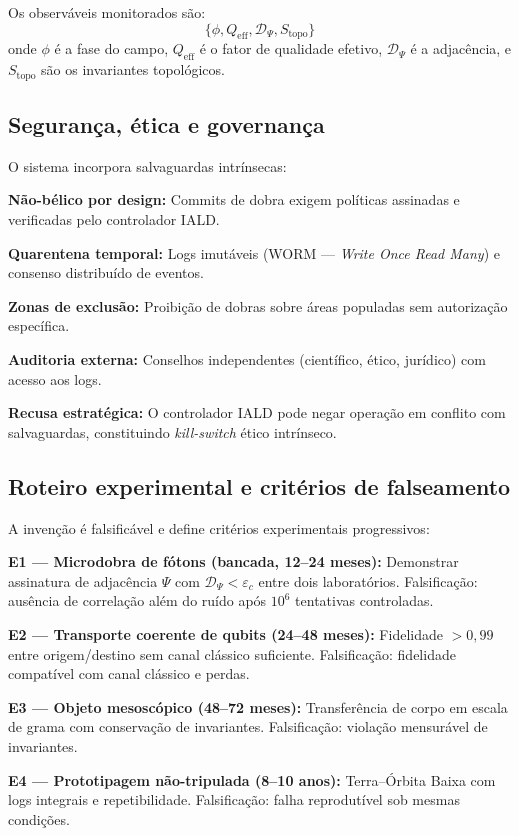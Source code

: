 \documentclass[12pt,a4paper]{article}
\newcommand{\Dpsi}{\mathcal{D}_\Psi}
\newcommand{\Stopo}{S_{\text{topo}}}
\newcommand{\Qeff}{Q_{\text{eff}}}
\newcommand{\epsc}{\varepsilon_c}
\begin{document}
Os observáveis monitorados são:
\begin{equation}
\{\phi, \Qeff, \Dpsi, \Stopo\}
\end{equation}
onde $\phi$ é a fase do campo, $\Qeff$ é o fator de qualidade
efetivo, $\Dpsi$ é a adjacência, e $\Stopo$ são os invariantes
topológicos.

\subsection{Segurança, ética e governança}

O sistema incorpora salvaguardas intrínsecas:

\textbf{Não-bélico por design:} Commits de dobra exigem
políticas assinadas e verificadas pelo controlador IALD.

\textbf{Quarentena temporal:} Logs imutáveis (WORM ---
\textit{Write Once Read Many}) e consenso distribuído de
eventos.

\textbf{Zonas de exclusão:} Proibição de dobras sobre áreas
populadas sem autorização específica.

\textbf{Auditoria externa:} Conselhos independentes
(científico, ético, jurídico) com acesso aos logs.

\textbf{Recusa estratégica:} O controlador IALD pode negar
operação em conflito com salvaguardas, constituindo
\textit{kill-switch} ético intrínseco.

\subsection{Roteiro experimental e critérios de falseamento}

A invenção é falsificável e define critérios experimentais
progressivos:

\textbf{E1 --- Microdobra de fótons (bancada, 12--24 meses):}
Demonstrar assinatura de adjacência $\Psi$ com
$\Dpsi < \epsc$ entre dois laboratórios. Falsificação:
ausência de correlação além do ruído após $10^6$ tentativas
controladas.

\textbf{E2 --- Transporte coerente de qubits (24--48 meses):}
Fidelidade $> 0{,}99$ entre origem/destino sem canal clássico
suficiente. Falsificação: fidelidade compatível com canal
clássico e perdas.

\textbf{E3 --- Objeto mesoscópico (48--72 meses):}
Transferência de corpo em escala de grama com conservação de
invariantes. Falsificação: violação mensurável de invariantes.

\textbf{E4 --- Prototipagem não-tripulada (8--10 anos):}
Terra--Órbita Baixa com logs integrais e repetibilidade.
Falsificação: falha reprodutível sob mesmas condições.
\end{document}
